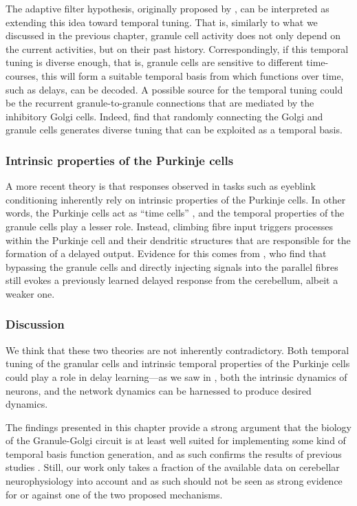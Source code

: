 The adaptive filter hypothesis, originally proposed by \citet{fujita1982adaptive}, can be interpreted as extending this idea toward temporal tuning.
That is, similarly to what we discussed in the previous chapter,
granule cell activity does not only depend on the current \PCN activities, but on their past history.
Correspondingly, if this temporal tuning is diverse enough, that is, granule cells are sensitive to different time-courses, this will form a suitable temporal basis from which functions over time, such as delays, can be decoded.
A possible source for the temporal tuning could be the recurrent granule-to-granule connections that are mediated by the inhibitory Golgi cells.
Indeed, \citet{rossert2015edge} find that randomly connecting the Golgi and granule cells generates diverse tuning that can be exploited as a temporal basis.


\subsubsection{Intrinsic properties of the Purkinje cells}
A more recent theory is that responses observed in tasks such as eyeblink conditioning inherently rely on intrinsic properties of the Purkinje cells.
In other words, the Purkinje cells act as \enquote{time cells} \citep{lusk2016cerebellar}, and the temporal properties of the granule cells play a lesser role.
Instead, climbing fibre input triggers processes within the Purkinje cell and their dendritic structures that are responsible for the formation of a delayed output.
Evidence for this comes from \citet{johansson2014memory}, who find that bypassing the granule cells and directly injecting signals into the parallel fibres still evokes a previously learned delayed response from the cerebellum, albeit a weaker one.


\subsubsection{Discussion}
We think that these two theories are not inherently contradictory.
Both temporal tuning of the granular cells and intrinsic temporal properties of the Purkinje cells could play a role in delay learning---as we saw in , both the intrinsic dynamics of neurons, and the network dynamics can be harnessed to produce desired dynamics.

The findings presented in this chapter provide a strong argument that the biology of the Granule-Golgi circuit is at least well suited for implementing some kind of temporal basis function generation, and as such confirms the results of previous studies  \citep[cf.][]{dean2010cerebellar,rossert2015edge}.
Still, our work only takes a fraction of the available data on cerebellar neurophysiology into account and as such should not be seen as strong evidence for or against one of the two proposed mechanisms.
